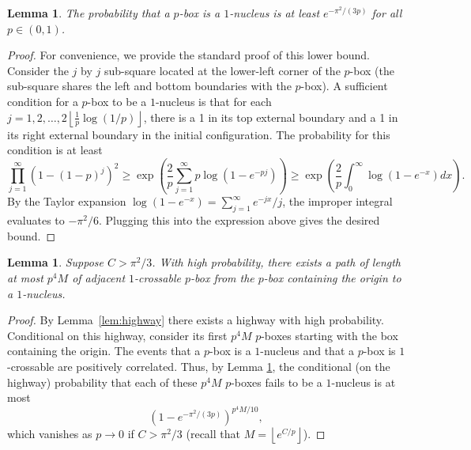 \documentclass{article}
\newcommand{\floor}[1]{\left\lfloor#1\right \rfloor}
\numberwithin{equation}{section}
\newtheorem{lemma}[theorem]{Lemma}
\begin{document}
\begin{lemma}\label{lem:1-nucleus}
    The probability that a $p$-box is a $1$-nucleus is at least $e^{-\pi^2/(3p)}$ for all $p \in (0,1)$.
\end{lemma}
\begin{proof}
    For convenience, we provide the standard proof of this lower bound.
    Consider the $j$ by $j$ sub-square located at the lower-left corner of the $p$-box (the sub-square shares the left and bottom boundaries with the $p$-box).
    A sufficient condition for a $p$-box to be a $1$-nucleus is that for each $j = 1,2,\dots, 2\floor{\frac{1}{p}\log(1/p)}$, there is a 1 in its top external boundary and a 1 in its right external boundary in the initial configuration.
    The probability for this condition is at least 
    \[
    \prod_{j = 1}^\infty (1 - (1 - p)^j)^2 
    \geq 
    \exp\left(\frac{2}{p}\sum_{j = 1}^\infty p \log(1 - e^{-pj})\right)
    \geq \exp\left(\frac{2}{p} \int_0^\infty \log(1 - e^{-x})dx\right).
    \]
    By the Taylor expansion $\log(1 - e^{-x}) = \sum_{j = 1}^\infty e^{-jx}/j$, the improper integral evaluates to $-\pi^2/6$.
    Plugging this into the expression above gives the desired bound.
\end{proof}

\begin{lemma}\label{lem:find1-nucleus}
    Suppose $C > \pi^2/3$. With high probability, there exists a path of length at most $p^4 M$ of adjacent $1$-crossable $p$-box from the $p$-box containing the origin to a $1$-nucleus.
\end{lemma}
\begin{proof}
    By Lemma~\ref{lem:highway} there exists a highway with high probability. Conditional on this highway, consider its first $p^4 M$ $p$-boxes starting with the box containing the origin.
    The events that a $p$-box is a $1$-nucleus and that a $p$-box is $1$-crossable are positively correlated.
    Thus, by Lemma \ref{lem:1-nucleus}, the conditional (on the highway) probability that each of these $p^4M$ $p$-boxes fails to be a $1$-nucleus is at most
    \[
    (1 - e^{-\pi^2/(3p)})^{p^4 M/10},
    \]
    which vanishes as $p \to 0$ if $C > \pi^2/3$ (recall that $M = \floor{e^{C/p}}$).
\end{proof}
\end{document}

